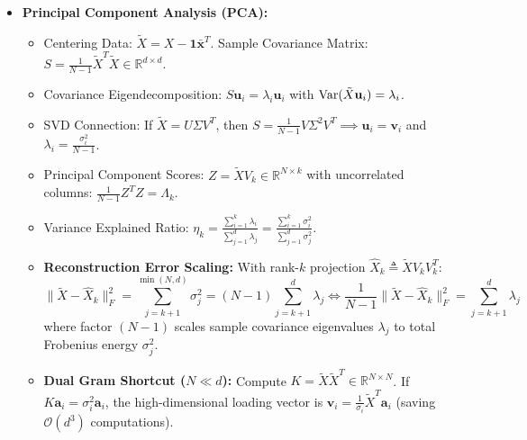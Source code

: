 \begin{tcolorbox}[breakable, colback=coralbg!30, colframe=coralborder, title={\large \textbf{3. SVD, Pseudoinverse \& Principal Component Analysis (Weeks 5--7)}}]
\begin{itemize}[leftmargin=*, noitemsep, topsep=2pt]
\begin{itemize}[leftmargin=*, noitemsep]
    \end{itemize}
    \item \textbf{Principal Component Analysis (PCA):}
    \begin{itemize}[leftmargin=*, noitemsep]
        \item Centering Data: $\tilde{X} = X - \mathbf{1}\bar{\mathbf{x}}^T$. Sample Covariance Matrix: $S = \frac{1}{N-1}\tilde{X}^T \tilde{X} \in \mathbb{R}^{d \times d}$.
        \item Covariance Eigendecomposition: $S \mathbf{u}_i = \lambda_i \mathbf{u}_i$ with $\operatorname{Var}(\tilde{X}\mathbf{u}_i) = \lambda_i$.
        \item SVD Connection: If $\tilde{X} = U \Sigma V^T$, then $S = \frac{1}{N-1} V \Sigma^2 V^T \implies \mathbf{u}_i = \mathbf{v}_i$ and $\lambda_i = \frac{\sigma_i^2}{N-1}$.
        \item Principal Component Scores: $Z = \tilde{X} V_k \in \mathbb{R}^{N \times k}$ with uncorrelated columns: $\frac{1}{N-1}Z^T Z = \Lambda_k$.
        \item Variance Explained Ratio: $\eta_k = \frac{\sum_{i=1}^k \lambda_i}{\sum_{j=1}^d \lambda_j} = \frac{\sum_{i=1}^k \sigma_i^2}{\sum_{j=1}^d \sigma_j^2}$.
        \item \textbf{Reconstruction Error Scaling:} With rank-$k$ projection $\hat{X}_k \triangleq \tilde{X} V_k V_k^T$:
        \begin{equation*}
        \|\tilde{X} - \hat{X}_k\|_F^2 = \sum_{j=k+1}^{\min(N, d)} \sigma_j^2 = (N-1)\sum_{j=k+1}^d \lambda_j \iff \frac{1}{N-1}\|\tilde{X} - \hat{X}_k\|_F^2 = \sum_{j=k+1}^d \lambda_j
        \end{equation*}
        where factor $(N-1)$ scales sample covariance eigenvalues $\lambda_j$ to total Frobenius energy $\sigma_j^2$.
        \item \textbf{Dual Gram Shortcut ($N \ll d$):} Compute $K = \tilde{X}\tilde{X}^T \in \mathbb{R}^{N \times N}$. If $K \mathbf{a}_i = \sigma_i^2 \mathbf{a}_i$, the high-dimensional loading vector is $\mathbf{v}_i = \frac{1}{\sigma_i} \tilde{X}^T \mathbf{a}_i$ (saving $\mathcal{O}(d^3)$ computations).
    \end{itemize}
\end{itemize}
\end{tcolorbox}

